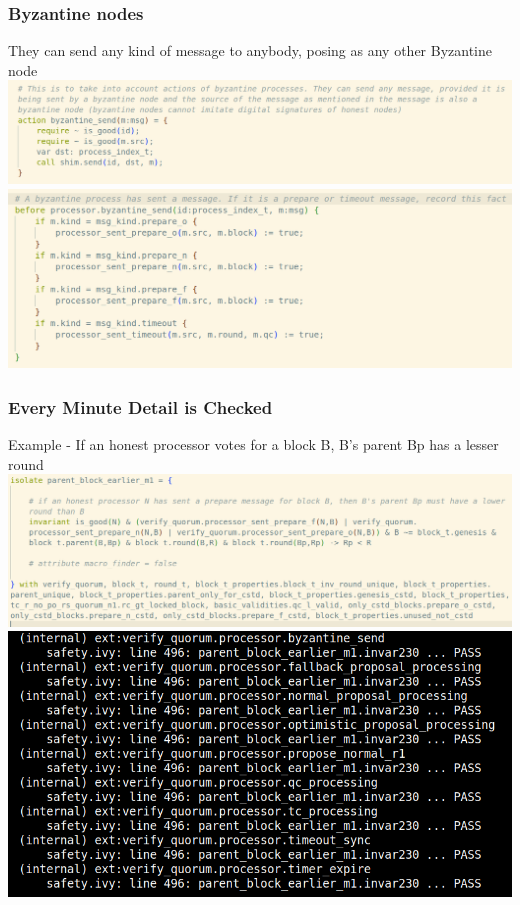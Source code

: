 \documentclass{beamer}
\begin{document}
\begin{frame}
    \frametitle{Byzantine nodes}
    They can send any kind of message to anybody, posing as any other
    Byzantine node
    \includegraphics[scale=0.25]{ByzantineSendMsg.png}
    \includegraphics[scale=0.25]{RecordByzantineAction.png}
\end{frame}

\begin{frame}
    \frametitle{Every Minute Detail is Checked}
    Example - If an honest processor votes for a block B, B's parent
    Bp has a lesser round
    \includegraphics[scale=0.25]{ParentBlockEarlier.png}
    \pause
    \includegraphics[scale=0.25]{ParentBlockEarlierPass.png}
\end{frame}
\end{document}
